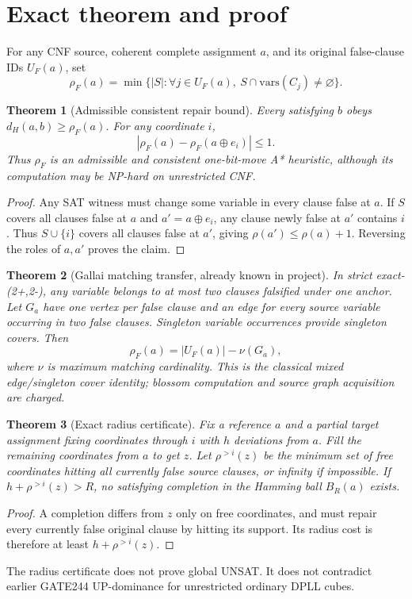 \documentclass[11pt]{article}
\newtheorem{theorem}{Theorem}
\begin{document}
\section{Exact theorem and proof}
For any CNF source, coherent complete assignment $a$, and its original false-clause IDs $U_F(a)$, set
\[
\rho_F(a)=\min\{|S|:\forall j\in U_F(a),\ S\cap \mathrm{vars}(C_j)\ne\varnothing\}.
\]
\begin{theorem}[Admissible consistent repair bound]
Every satisfying $b$ obeys $d_H(a,b)\ge \rho_F(a)$. For any coordinate $i$,
\[
\boxed{|\rho_F(a)-\rho_F(a\oplus e_i)|\le1.}
\]
Thus $\rho_F$ is an admissible and consistent one-bit-move A* heuristic, although its computation may be NP-hard on unrestricted CNF.
\end{theorem}
\begin{proof}
Any SAT witness must change some variable in every clause false at $a$. If $S$ covers all clauses false at $a$ and $a'=a\oplus e_i$, any clause newly false at $a'$ contains $i$. Thus $S\cup\{i\}$ covers all clauses false at $a'$, giving $\rho(a')\le\rho(a)+1$. Reversing the roles of $a,a'$ proves the claim.
\end{proof}
\begin{theorem}[Gallai matching transfer, already known in project]
In strict exact-(2+,2-), any variable belongs to at most two clauses falsified under one anchor. Let $G_a$ have one vertex per false clause and an edge for every source variable occurring in two false clauses. Singleton variable occurrences provide singleton covers. Then
\[
\boxed{\rho_F(a)=|U_F(a)|-\nu(G_a),}
\]
where $\nu$ is maximum matching cardinality. This is the classical mixed edge/singleton cover identity; blossom computation and source graph acquisition are charged.
\end{theorem}
\begin{theorem}[Exact radius certificate]
Fix a reference $a$ and a partial target assignment fixing coordinates through $i$ with $h$ deviations from $a$. Fill the remaining coordinates from $a$ to get $z$. Let $\rho^{>i}(z)$ be the minimum set of free coordinates hitting all currently false source clauses, or infinity if impossible. If $h+\rho^{>i}(z)>R$, no satisfying completion in the Hamming ball $B_R(a)$ exists.
\end{theorem}
\begin{proof}
A completion differs from $z$ only on free coordinates, and must repair every currently false original clause by hitting its support. Its radius cost is therefore at least $h+\rho^{>i}(z)$.
\end{proof}
The radius certificate does not prove global UNSAT. It does not contradict earlier GATE244 UP-dominance for unrestricted ordinary DPLL cubes.
\end{document}
